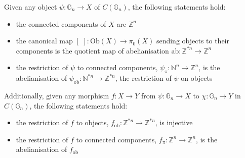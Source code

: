 \documentclass{amsart} %
\begin{document}
\begin{lem} Given any object $\psi: \mathbb{G}_n \to X$ of $C(\mathbb{G}_n)$, the following statements hold:
\begin{itemize}
\item the connected components of $X$ are $\mathbb{Z}^n$
\item the canonical map $[ \, \, ]: \mathrm{Ob}(X) \to \pi_0(X)$ sending objects to their components is the quotient map of abelianisation $\mathrm{ab}: \mathbb{Z}^{\ast n} \to \mathbb{Z}^n$
\item the restriction of $\psi$ to connected components, $\psi_\pi: \mathbb{N}^n \to \mathbb{Z}^n$, is the abelianisation of $\psi_{\mathrm{ob}}: \mathbb{N}^{\ast n} \to \mathbb{Z}^{\ast n}$, the restriction of $\psi$ on objects
\end{itemize}
Additionally, given any morphism $f:X \to Y$ from $\psi: \mathbb{G}_n \to X$ to $\chi: \mathbb{G}_n \to Y$ in $C(\mathbb{G}_n)$, the following statements hold:
\begin{itemize}
\item the restriction of $f$ to objects, $f_{\mathrm{ob}}: \mathbb{Z}^{\ast n} \to \mathbb{Z}^{\ast n}$, is injective
\item the restriction of $f$ to connected components, $f_\pi: \mathbb{Z}^n \to \mathbb{Z}^n$, is the abelianisation of $f_{\mathrm{ob}}$
\end{itemize}
\end{lem}
\end{document}
